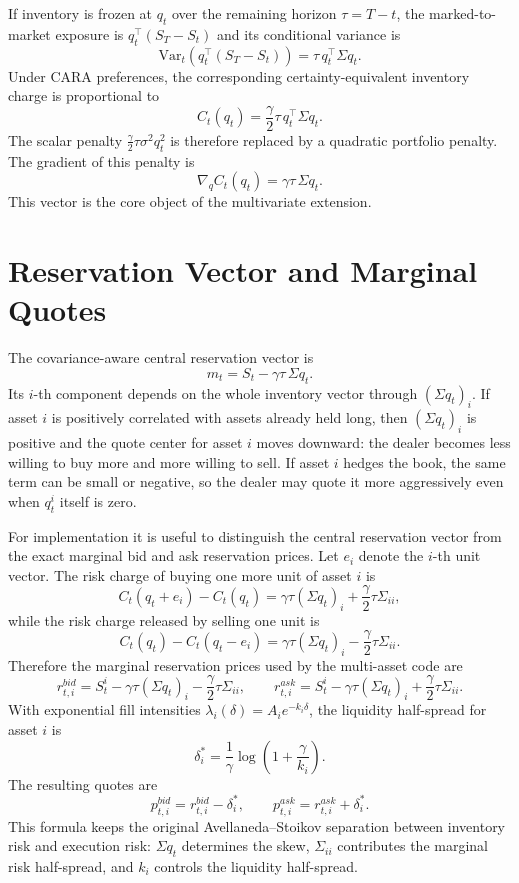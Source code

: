 \documentclass[a4paper,10pt,titlepage,oneside,openany]{book}
\theoremstyle{plain}\newtheorem{theorem}{Theorem}[chapter]
\theoremstyle{definition}\newtheorem{definition}{Definition}[chapter]
\theoremstyle{remark}\newtheorem{remark}{Remark}[chapter]
\begin{document}
If inventory is frozen at $q_t$ over the remaining horizon $\tau=T-t$, the marked-to-market exposure is $q_t^\top(S_T-S_t)$ and its conditional variance is
\[
\mathrm{Var}_t\!\left(q_t^\top(S_T-S_t)\right)=\tau\,q_t^\top\Sigma q_t.
\]
Under CARA preferences, the corresponding certainty-equivalent inventory charge is proportional to
\[
C_t(q_t)=\frac{\gamma}{2}\tau\,q_t^\top\Sigma q_t.
\]
The scalar penalty $\frac{\gamma}{2}\tau\sigma^2 q_t^2$ is therefore replaced by a quadratic portfolio penalty. The gradient of this penalty is
\[
\nabla_q C_t(q_t)=\gamma\tau\,\Sigma q_t.
\]
This vector is the core object of the multivariate extension.

\section{Reservation Vector and Marginal Quotes}
The covariance-aware central reservation vector is
\[
m_t=S_t-\gamma\tau\,\Sigma q_t.
\]
Its $i$-th component depends on the whole inventory vector through $(\Sigma q_t)_i$. If asset $i$ is positively correlated with assets already held long, then $(\Sigma q_t)_i$ is positive and the quote center for asset $i$ moves downward: the dealer becomes less willing to buy more and more willing to sell. If asset $i$ hedges the book, the same term can be small or negative, so the dealer may quote it more aggressively even when $q_t^i$ itself is zero.

For implementation it is useful to distinguish the central reservation vector from the exact marginal bid and ask reservation prices. Let $e_i$ denote the $i$-th unit vector. The risk charge of buying one more unit of asset $i$ is
\[
C_t(q_t+e_i)-C_t(q_t)
=\gamma\tau(\Sigma q_t)_i+\frac{\gamma}{2}\tau\Sigma_{ii},
\]
while the risk charge released by selling one unit is
\[
C_t(q_t)-C_t(q_t-e_i)
=\gamma\tau(\Sigma q_t)_i-\frac{\gamma}{2}\tau\Sigma_{ii}.
\]
Therefore the marginal reservation prices used by the multi-asset code are
\[
r_{t,i}^{bid}=S_t^i-\gamma\tau(\Sigma q_t)_i-\frac{\gamma}{2}\tau\Sigma_{ii},
\qquad
r_{t,i}^{ask}=S_t^i-\gamma\tau(\Sigma q_t)_i+\frac{\gamma}{2}\tau\Sigma_{ii}.
\]
With exponential fill intensities $\lambda_i(\delta)=A_i e^{-k_i\delta}$, the liquidity half-spread for asset $i$ is
\[
\delta_i^*=\frac{1}{\gamma}\log\!\left(1+\frac{\gamma}{k_i}\right).
\]
The resulting quotes are
\[
p_{t,i}^{bid}=r_{t,i}^{bid}-\delta_i^*,
\qquad
p_{t,i}^{ask}=r_{t,i}^{ask}+\delta_i^*.
\]
This formula keeps the original Avellaneda--Stoikov separation between inventory risk and execution risk: $\Sigma q_t$ determines the skew, $\Sigma_{ii}$ contributes the marginal risk half-spread, and $k_i$ controls the liquidity half-spread.
\end{document}
